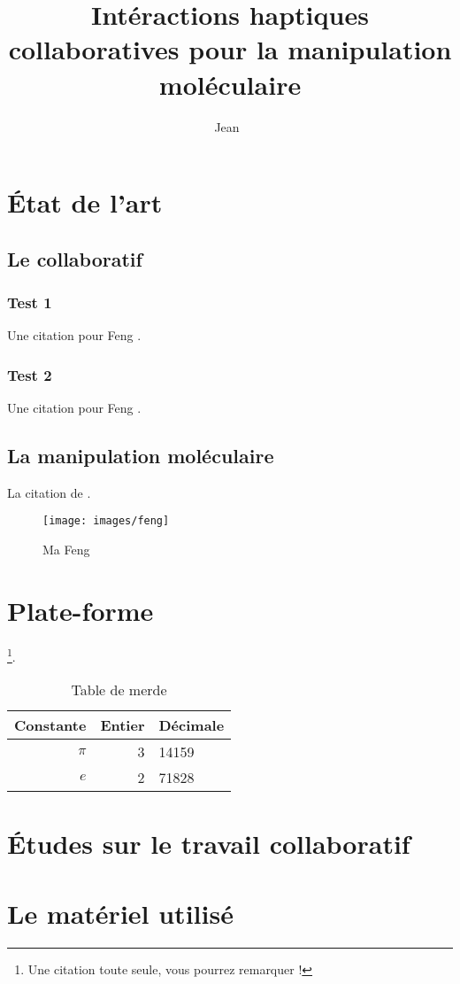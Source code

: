 \documentclass[english]{mythesis}
\title{Intéractions haptiques collaboratives pour la manipulation moléculaire}
\author{Jean~\name{Simard}}
\date{\mydate[datestyle=long]{01}{12}{2011}}
\begin{document}
	\frontmatter
	\maketitle
	\mytoc
	\mylof
	\mylot
	\mainmatter
	\chapter{État de l'art}
	\myminitoc
	\section{Le collaboratif}
	\subsection{Test 1}
	Une citation pour Feng .

	\subsection{Test 2}
	Une citation pour Feng .
	\myminibiblio

	\section{La manipulation moléculaire}
	La citation de .
	\begin{figure}[htp]
		\centering
		\texttt{[image: images/feng]}
		\caption{Ma Feng}\label{fig-MaFeng}
	\end{figure}
	\myminibiblio

	\chapter{Plate-forme}
	\footnote{Une citation toute seule, vous pourrez remarquer !}.
	\begin{table}[htp]
		\centering
		\caption{Table de merde}\label{tab-TableDeMerde}
		\begin{tabular}{rr@{,}l}
			\hline
			Constante & Entier & Décimale \\
			\hline
			$\pi$ & 3 & 14159 \\
			$e$ & 2 & 71828 \\
			\hline
		\end{tabular}
	\end{table}
	\myminibiblio

	\chapter{Études sur le travail collaboratif}
	\myminibiblio

	\appendix

	\chapter{Le matériel utilisé}
\end{document}
